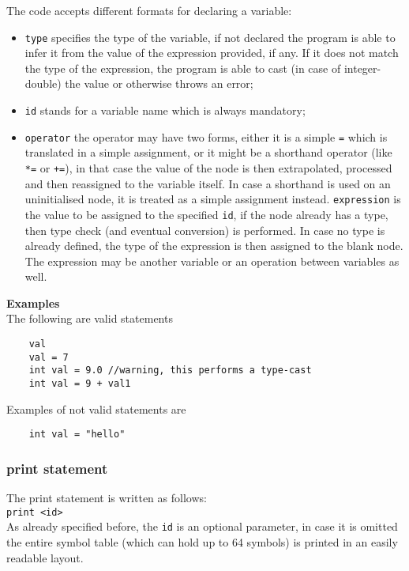 \documentclass{article}
\begin{document}
The code accepts different formats for declaring a variable: 
\begin{itemize}
    \item \verb|type| specifies the type of the variable, if not declared the program is able to infer it from the value of the expression provided, if any. If it does not match the type of the expression, the program is able to cast (in case of integer-double) the value or otherwise throws an error;
    \item \verb|id| stands for a variable name which is always mandatory;
    \item \verb|operator| the operator may have two forms, either it is a simple \verb|=| which is translated in a simple assignment, or it might be a shorthand operator (like \verb|*=| or \verb|+=|), in that case the value of the node is then extrapolated, processed and then reassigned to the variable itself. In case a shorthand is used on an uninitialised node, it is treated as a simple assignment instead.
    \verb|expression| is the value to be assigned to the specified \verb|id|, if the node already has a type, then type check (and eventual conversion) is performed. In case no type is already defined, the type of the expression is then assigned to the blank node. The expression may be another variable or an operation between variables as well. 
\end{itemize}
\textbf{Examples}\\
The following are valid statements
\begin{verbatim}
    val
    val = 7
    int val = 9.0 //warning, this performs a type-cast
    int val = 9 + val1
\end{verbatim}
Examples of not valid statements are
\begin{verbatim}
    int val = "hello"
\end{verbatim}

\subsubsection*{print statement}
The print statement is written as follows:\\

\verb|print <id>|\\

As already specified before, the \verb|id| is an optional parameter, in case it is omitted the entire symbol table (which can hold up to 64 symbols) is printed in an easily readable layout.\\
\end{document}
